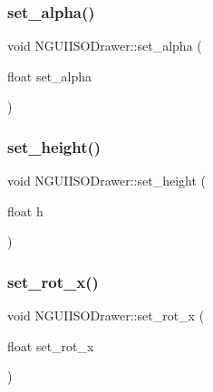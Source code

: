 \hypertarget{class_n_g_u_i_i_s_o_drawer_a39426602f74f177f73f62aec431c3e1f}{}\label{class_n_g_u_i_i_s_o_drawer_a39426602f74f177f73f62aec431c3e1f} 
\subsubsection{\texorpdfstring{set\+\_\+alpha()}{set\_alpha()}}
{\footnotesize\ttfamily void N\+G\+U\+I\+I\+S\+O\+Drawer\+::set\+\_\+alpha (\begin{DoxyParamCaption}\item[{float}]{set\+\_\+alpha }\end{DoxyParamCaption})}

\hypertarget{class_n_g_u_i_i_s_o_drawer_a0cfa138281b7c6abd0684d675b1604ec}{}\label{class_n_g_u_i_i_s_o_drawer_a0cfa138281b7c6abd0684d675b1604ec} 
\subsubsection{\texorpdfstring{set\+\_\+height()}{set\_height()}}
{\footnotesize\ttfamily void N\+G\+U\+I\+I\+S\+O\+Drawer\+::set\+\_\+height (\begin{DoxyParamCaption}\item[{float}]{h }\end{DoxyParamCaption})}

\hypertarget{class_n_g_u_i_i_s_o_drawer_a0b3dd22c9c3c94f80c9f8117e6c513ce}{}\label{class_n_g_u_i_i_s_o_drawer_a0b3dd22c9c3c94f80c9f8117e6c513ce} 
\subsubsection{\texorpdfstring{set\+\_\+rot\+\_\+x()}{set\_rot\_x()}}
{\footnotesize\ttfamily void N\+G\+U\+I\+I\+S\+O\+Drawer\+::set\+\_\+rot\+\_\+x (\begin{DoxyParamCaption}\item[{float}]{set\+\_\+rot\+\_\+x }\end{DoxyParamCaption})}

